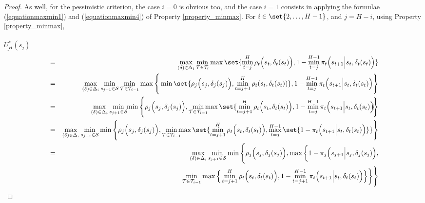 \begin{proof}
As well, for the pessimistic criterion,
the case $i=0$ is obvious too, and the case $i=1$ consists in applying the formulae 
(\ref{equationmaxmin1}) and (\ref{equationmaxmin4}) of Property \ref{property_minmax}.
For $i \in \set{2, \ldots, H-1}$, and $j=H-i$, using Property \ref{property_minmax},\\ 
\\
$\underline{U^*_H}(s_j)$ \vspace{-0.5cm}
\begin{eqnarray}
\nonumber  & = & \displaystyle \max_{(\delta) \in \Delta_i} \min_{\mathcal{T} \in \mathcal{T}_i} \max \set{ \min_{t=j}^{H} \rho_t \Big( s_t,\delta_t(s_t) \Big), 1- \min_{t=j}^{H-1} \pi_t \Big( s_{t+1} \Big\vert s_t , \delta_t(s_t) \Big) } \\
\nonumber & = &  \displaystyle \max_{(\delta) \in \Delta_i} \min_{s_{j+1} \in \mathcal{S}} \min_{\mathcal{T} \in \mathcal{T}_{i-1}} \max \Bigg\{ \min \set{ \rho_j \Big( s_j,\delta_j(s_j) \Big), \min_{t=j+1}^{H} \rho_t(s_t,\delta_t(s_t))}, 1- \min_{t=j}^{H-1} \pi_t \Big( s_{t+1} \Big\vert s_t , \delta_t(s_t) \Big) \Bigg\} \\
\label{maxminlambdafg} & = &  \displaystyle \max_{(\delta) \in \Delta_i} \min_{s_{j+1} \in \mathcal{S}} \hspace{-0.1cm} \min \Bigg\{ \rho_j \Big( s_j,\delta_j(s_j) \Big), \min_{\mathcal{T} \in \mathcal{T}_{i-1}} \hspace{-0.2cm} \max \set{  \min_{t=j+1}^{H} \rho_t \Big( s_t,\delta_t(s_t) \Big), 1- \min_{t=j}^{H-1} \pi_t \Big( s_{t+1} \Big\vert s_t , \delta_t(s_t) \Big) \hspace{-0.14cm} } \hspace{-0.1cm} \Bigg\} \\
\nonumber & = &  \displaystyle \max_{(\delta) \in \Delta_i} \min_{s_{j+1} \in \mathcal{S}} \min \Bigg\{ \rho_j \Big( s_j,\delta_j(s_j) \Big), \min_{\mathcal{T} \in \mathcal{T}_{i-1}} \hspace{-0.2cm} \max \set{  \min_{t=j+1}^{H} \rho_t \Big( s_t,\delta_t(s_t) \Big), \max_{t=j}^{H-1} \set{ 1 -  \pi_t \Big( s_{t+1} \Big\vert s_t , \delta_t(s_t) \Big) } } \Bigg\} \\
\nonumber & = &  \displaystyle \max_{(\delta) \in \Delta_i} \min_{s_{j+1} \in \mathcal{S}} \min \Bigg\{ \rho_j \Big(s_j,\delta_j(s_j)\Big), \max \bigg\{ 1- \pi_j \Big( s_{j+1} \Big\vert s_j, \delta_j(s_j) \Big), \\ 
\nonumber & & \hspace{4.5cm} \min_{\mathcal{T} \in \mathcal{T}_{i-1}} \max \Big\{  \min_{t=j+1}^{H} \rho_t \Big( s_t,\delta_t(s_t) \Big), 1- \min_{t=j+1}^{H-1} \pi_t \Big( s_{t+1} \Big\vert s_t , \delta_t(s_t) \Big) \Big\} \bigg\} \Bigg\} \\

\end{eqnarray}
\end{proof}
